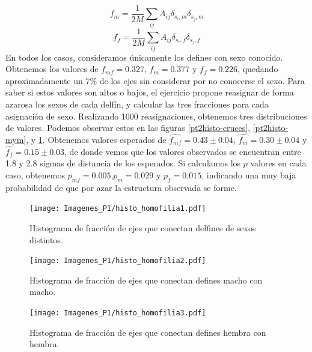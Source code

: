 \documentclass{article}
\begin{document}
\begin{equation}
        f_{m} = \frac{1}{2M}\sum_{ij} A_{ij} \delta_{s_i,m} \delta_{s_j,m} 
\end{equation}
\begin{equation}
        f_{f} = \frac{1}{2M}\sum_{ij} A_{ij} \delta_{s_i,f} \delta_{s_j,f} 
\end{equation}
En todos los casos, consideramos únicamente los defines con sexo conocido. Obtenemos los valores de $f_{mf} = 0.327$, $f_{m} = 0.377$ y $f_{f} = 0.226$, quedando aproximadamente un $7\%$ de los ejes sin considerar por no conocerse el sexo. Para saber si estos valores son altos o bajos, el ejercicio propone reasignar de forma azarosa los sexos de cada delfín, y calcular las tres fracciones para cada asignación de sexo. Realizando 1000 reasignaciones, obtenemos tres distribuciones de valores. Podemos observar estos en las figuras \ref{pt2histo-cruces}, \ref{pt2histo-mym}, y \ref{pt2histo-fyf}. Obtenemos valores esperados de $\widehat{f_{mf}} = 0.43 \pm 0.04$, $\widehat{f_{m}} = 0.30 \pm 0.04$ y $\widehat{f_{f}} = 0.15 \pm 0.03$, de donde vemos que los valores observados se encuentran entre 1.8 y 2.8 sigmas de distancia de los esperados. Si calculamos los $p$ valores en cada caso, obtenemos $p_{mf} = 0.005$,$p_m = 0.029$ y $p_f = 0.015$, indicando una muy baja probabilidad de que por azar la estructura observada se forme.

\begin{figure}[!htb]
   \begin{minipage}{0.3\textwidth}
	\centering
	\texttt{[image: Imagenes\_P1/histo\_homofilia1.pdf]}
	\caption{Histograma de fracción de ejes que conectan delfines de sexos distintos.}
	\label{pt2histo-cruces}
   \end{minipage}\hfill
   \begin{minipage}{0.3\textwidth}
	\centering
	\texttt{[image: Imagenes\_P1/histo\_homofilia2.pdf]}
	\caption{Histograma de fracción de ejes que conectan defines macho con macho.}
	\label{pt2histo-mym}
   \end{minipage}\hfill
   \begin{minipage}{0.3\textwidth}
	\centering
	\texttt{[image: Imagenes\_P1/histo\_homofilia3.pdf]}
	\caption{Histograma de fracción de ejes que conectan defines hembra con hembra.}
	\label{pt2histo-fyf}
   \end{minipage}
\end{figure}
\end{document}
